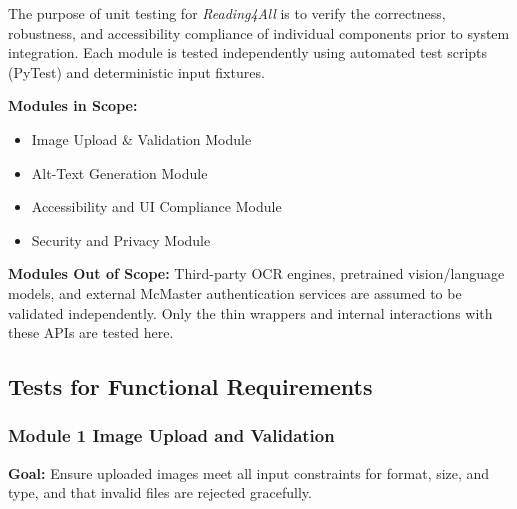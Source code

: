\documentclass[12pt, titlepage]{article}
\begin{document}
The purpose of unit testing for \textit{Reading4All} is to verify the
correctness, robustness, and accessibility compliance of individual
components prior to system integration. Each module is tested
independently using automated test scripts (PyTest) and deterministic
input fixtures.

\textbf{Modules in Scope:}
\begin{itemize}
\item Image Upload \& Validation Module
\item Alt-Text Generation Module
\item Accessibility and UI Compliance Module
\item Security and Privacy Module
\end{itemize}

\textbf{Modules Out of Scope:}
Third-party OCR engines, pretrained vision/language models, and
external McMaster authentication services are assumed to be validated
independently. Only the thin wrappers and internal interactions with
these APIs are tested here.

\subsection{Tests for Functional Requirements}

\subsubsection{Module 1 \textemdash{} Image Upload and Validation}

\textbf{Goal:} Ensure uploaded images meet all input constraints for
format, size, and type, and that invalid files are rejected gracefully.
\end{document}

